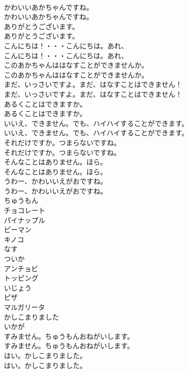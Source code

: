 \documentclass[8pt]{extreport}
\begin{document}
\begin{CJK}{UTF8}{min}
\\	かわいいあかちゃんですね。	
\\	かわいいあかちゃんですね。 
\\	ありがとうございます。	
\\	ありがとうございます。 
\\	こんにちは！・・・こんにちは。あれ、	
\\	こんにちは！・・・こんにちは。あれ、 
\\	このあかちゃんははなすことができませんか。	
\\	このあかちゃんははなすことができませんか。 
\\	まだ、いっさいですよ。まだ、はなすことはできません！	
\\	まだ、いっさいですよ。まだ、はなすことはできません！ 
\\	あるくことはできますか。	
\\	あるくことはできますか。 
\\	いいえ、できません。でも、ハイハイすることができます。	
\\	いいえ、できません。でも、ハイハイすることができます。 
\\	それだけですか。つまらないですね。	
\\	それだけですか。つまらないですね。 
\\	そんなことはありません。ほら。	
\\	そんなことはありません。ほら。 
\\	うわー、かわいいえがおですね。	
\\	うわー、かわいいえがおですね。 
\\	ちゅうもん
\\	チョコレート
\\	パイナップル
\\	ピーマン
\\	キノコ
\\	なす
\\	ついか
\\	アンチョビ
\\	トッピング
\\	いじょう
\\	ピザ
\\	マルガリータ
\\	かしこまりました
\\	いかが
\\	すみません。ちゅうもんおねがいします。	
\\	すみません。ちゅうもんおねがいします。 
\\	はい。かしこまりました。	
\\	はい。かしこまりました。 

\end{CJK}
\end{document}
